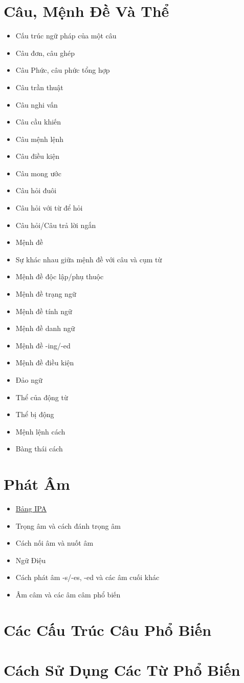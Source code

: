 \chapter{Câu, Mệnh Đề Và Thể}
\begin{multicols*}{2}
    \begin{itemize}
        \item Cấu trúc ngữ pháp của một câu
        \item Câu đơn, câu ghép
        \item Câu Phức, câu phức tổng hợp
        \item Câu trần thuật
        \item Câu nghi vấn
        \item Câu cầu khiến
        \item Câu mệnh lệnh
        \item Câu điều kiện
        \item Câu mong ước
        \item Câu hỏi đuôi
        \item Câu hỏi với từ để hỏi
        \item Câu hỏi/Câu trả lời ngắn
        \item Mệnh đề
        \item Sự khác nhau giữa mệnh đề với câu và cụm từ
        \item Mệnh đề độc lập/phụ thuộc
        \item Mệnh đề trạng ngữ
        \item Mệnh đề tính ngữ
        \item Mệnh đề danh ngữ
        \item Mệnh đề -ing/-ed
        \item Mệnh đề điều kiện
        \item Đảo ngữ
        \item Thể của động từ
        \item Thể bị động
        \item Mệnh lệnh cách
        \item Bàng thái cách
    \end{itemize}
\end{multicols*}

\chapter{Phát Âm}
\begin{multicols*}{2}
    \begin{itemize}
        \item \href{https://www.cambridge.org/features/IPAchart/}{Bảng IPA}
        \item Trọng âm và cách đánh trọng âm
        \item Cách nối âm và nuốt âm
        \item Ngữ Điệu
        \item Cách phát âm -s/-es, -ed và các âm cuối khác
        \item Âm câm và các âm câm phổ biến
    \end{itemize}
\end{multicols*}

\chapter{Các Cấu Trúc Câu Phổ Biến}
\chapter{Cách Sử Dụng Các Từ Phổ Biến}
